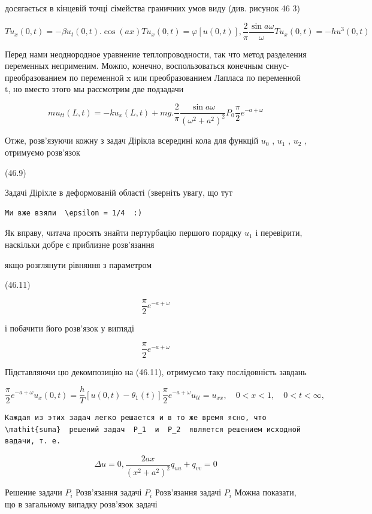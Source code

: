 \documentclass[
  ukrainian,
]{article}
\begin{document}
досягається в кінцевій точці сімейства граничних умов виду (див. рисунок
46 3)

\[
Tu_x(0, t) = -\beta u_t(0, t).
\cos(ax)
Tu_{x}(0, t) = \varphi[u(0, t)],
\frac{2}{\pi} \frac{\sin a\omega}{\omega}
Tu_{x}(0, t) = -hu^{3}(0, t)
\]

Перед нами неоднородное уравнение теплопроводности, так что метод
разделения переменных неприменим. Можпо, конечно, воспользоваться
конечным синус-преобразованием по переменной x или преобразованием
Лапласа по переменной t, но вместо этого мы рассмотрим две подзадачи

\[
mu_{tt}(L, t) = -ku_x(L, t) + mg.
\frac{2}{\pi} \frac{\sin a\omega}{(\omega^2+a^2)^2}
P_{0}
\frac{\pi}{2} e^{-a+\omega}
\]

Отже, розв'язуючи кожну з задач Дірікла всередині кола для функцій
\(u_0\) , \(u_1\) , \(u_2\) , отримуємо розв'язок

(46.9)

Задачі Діріхле в деформованій області (зверніть увагу, що тут

\begin{verbatim}
Ми вже взяли  \epsilon = 1/4  :)
\end{verbatim}

Як вправу, читача просять знайти пертурбацію першого порядку \(u_1\) і
перевірити, наскільки добре є приблизне розв'язання

якщо розглянути рівняння з параметром

(46.11)

\[
\frac{\pi}{2} e^{-a+\omega}
\]

і побачити його розв'язок у вигляді

\[
\frac{\pi}{2} e^{-a+\omega}
\]

Підставляючи цю декомпозицію на (46.11), отримуємо таку послідовність
завдань

\[
\frac{\pi}{2} e^{-a+\omega}
u_{x}(0, t) = \frac{h}{T} [u(0, t) - \theta_{1}(t)]
\frac{\pi}{2} e^{-a+\omega}
u_{tt} = u_{xx}, \quad 0 < x < 1, \quad 0 < t < \infty,
\]

\begin{verbatim}
Каждая из этих задач легко решается и в то же время ясно, что  \mathit{suma}  решений задач  P_1  и  P_2  является решением исходной вадачи, т. е.
\end{verbatim}

\[
\Delta u = 0,
\frac{2ax}{(x^2+a^2)^2}
q_{uu} + q_{vv} = 0
\]

Решение задачи \(P_{i}\) Розв'язання задачі \(P_i\) Розв'язання задачі
\(P_i\) Можна показати, що в загальному випадку розв'язок задачі
\end{document}
